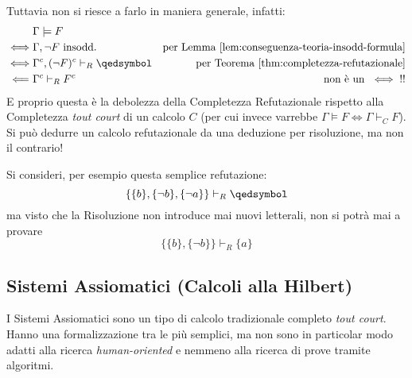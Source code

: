 Tuttavia non si riesce a farlo in maniera generale, infatti:
\begin{align*}
& \Gamma \models F \\
\iff & \Gamma, \neg F \text{ insodd.} & \text{per Lemma~\ref{lem:conseguenza-teoria-insodd-formula}} \\
\iff & \Gamma^c, (\neg F)^c \vdash_R \qedsymbol & \text{per Teorema}~\ref{thm:completezza-refutazionale} \\
\Longleftarrow\ & \Gamma^c \vdash_R F^c & \text{non è un } \iff \text{!!}
\end{align*}
E proprio questa è la debolezza della Completezza Refutazionale rispetto alla Completezza \textit{tout court} di un calcolo $C$ (per cui invece varrebbe $\Gamma \models F \iff \Gamma \vdash_C F$). \\
Si può dedurre un calcolo refutazionale da una deduzione per risoluzione, ma non il contrario!

Si consideri, per esempio questa semplice refutazione:
$$
\{\{b\}, \{\neg b\}, \{\neg a\}\} \vdash_R \qedsymbol
$$
ma visto che la Risoluzione non introduce mai nuovi letterali, non si potrà mai a provare 
$$
\{\{b\},\{\neg b\}\} \vdash_R \{a\}
$$
\subsection{Sistemi Assiomatici (Calcoli alla Hilbert)}
I Sistemi Assiomatici sono un tipo di calcolo tradizionale completo \textit{tout court}. Hanno una formalizzazione tra le più semplici, ma non sono in particolar modo adatti alla ricerca \textit{human-oriented} e nemmeno alla ricerca di prove tramite algoritmi. 

